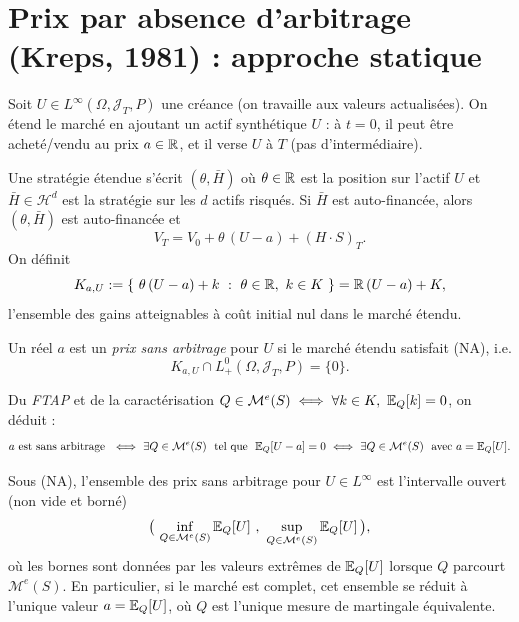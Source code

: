 \section{Prix par absence d'arbitrage (Kreps, 1981) : approche statique}

Soit $U\in L^\infty(\Omega,\mathcal{J}_T,P)$ une créance (on travaille aux valeurs actualisées).  
On étend le marché en ajoutant un actif synthétique $U$ : à $t=0$, il peut être acheté/vendu au prix $a\in\mathbb{R}$, et il verse $U$ à $T$ (pas d'intermédiaire).

Une stratégie étendue s'écrit $(\theta,\bar H)$ où $\theta\in\mathbb{R}$ est la position sur l'actif $U$ et $\bar H\in\mathcal{H}^{d}$ est la stratégie sur les $d$ actifs risqués.  
Si $\bar H$ est auto-financée, alors $(\theta,\bar H)$ est auto-financée et
\begin{equation}
V_T = V_0 + \theta\,(U-a) + (H\cdot S)_T.
\end{equation}
On définit
\begin{equation}
K_{a,U} := \{\ \theta\,(U-a) + k \ :\ \theta\in\mathbb{R},\ k\in K\ \}
= \mathbb{R}\,(U-a)+K,
\end{equation}
l'ensemble des gains atteignables à coût initial nul dans le marché étendu.

\begin{definition}
Un réel $a$ est un \emph{prix sans arbitrage} pour $U$ si le marché étendu satisfait (NA), i.e.
\begin{equation}
K_{a,U}\cap L_+^0(\Omega,\mathcal{J}_T,P)=\{0\}.
\end{equation}
\end{definition}

\begin{remarque}
Du \emph{FTAP} et de la caractérisation $Q\in\mathcal{M}^e(S)\iff \forall k\in K,\ \E_Q[k]=0$, on déduit :
\[
a \text{ est sans arbitrage } \ \Longleftrightarrow\ \exists Q\in\mathcal{M}^e(S)\ \text{ tel que }\ \E_Q[U-a]=0
\ \Longleftrightarrow\ \exists Q\in\mathcal{M}^e(S)\ \text{ avec } a=\E_Q[U].
\]
\end{remarque}

\begin{theoreme}
\label{thm:intervalle_prix_NA}
Sous (NA), l'ensemble des prix sans arbitrage pour $U\in L^\infty$ est l'intervalle ouvert (non vide et borné)
\begin{equation}
\big(\, \inf_{Q\in\mathcal{M}^e(S)} \E_Q[U]\ ,\ \sup_{Q\in\mathcal{M}^e(S)} \E_Q[U] \,\big),
\end{equation}
où les bornes sont données par les valeurs extrêmes de $\mathbb{E}_Q[U]$ lorsque $Q$ parcourt $\mathcal{M}^e(S)$.
En particulier, si le marché est complet, cet ensemble se réduit à l'unique valeur $a=\mathbb{E}_Q[U]$, où $Q$ est l'unique mesure de martingale équivalente.
\end{theoreme}

